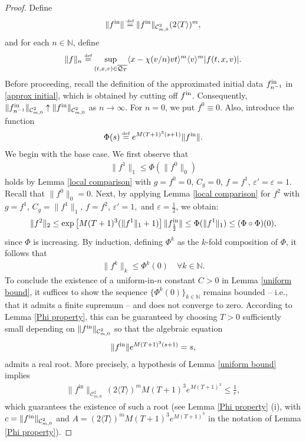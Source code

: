 \documentclass[reqno,11pt,final]{amsart}
\theoremstyle{plain}
\numberwithin{equation}{section}
\numberwithin{theorem}{section}
\newcommand{\eqdef }{\overset{\mbox{\tiny{def}}}{=}}
\begin{document}
\begin{proof}
Define
\begin{align*}
\|f^\textup{in}\| \eqdef \| f^\textup{in}\|_{\mathcal{C}^2_{m,0}}(2\langle T\rangle)^m,
\end{align*}and for each $n\in\mathbb{N}$, define
\begin{align*}
\| f\|_n \eqdef \sup_{(t,x,v)\in \overline{\mathcal{Q}_T}}\langle x-\chi(v/n)vt\rangle^m \langle v\rangle^m|f(t,x,v)|.
\end{align*}Before proceeding, recall the definition of the approximated initial data $f^\textup{in}_{n^{-1}}$ in \eqref{approx initial}, which is obtained by cutting off $f^\textup{in}$. Consequently, $\|f^\textup{in}_{n^{-1}}\|_{\mathcal{C}^2_{m,0}} \uparrow \|f^\textup{in}\|_{\mathcal{C}^2_{m,0}}$ as $n\to\infty$. For $n=0$, we put $f^0\equiv 0$. Also, introduce the function
\begin{align*}
\Phi(s) \eqdef e^{M(T+1)^3(s + 1)}\lVert f^\textup{in}\rVert.
\end{align*}We begin with the base case. We first observe that
\begin{align*}
\lVert f^1\rVert_1 \le \Phi(\lVert f^0\rVert_0)
\end{align*} holds by Lemma \ref{local comparison} with $g=f^0=0$, $C_g=0$, $f=f^1$, $\varepsilon'=\varepsilon=1$.  Recall that $\lVert f^0\rVert_0 =0$. Next, by applying Lemma \ref{local comparison} for $f^2$ with $g=f^1$, $C_g= \|f^1\|_1$, $f=f^2$, $\varepsilon'=1,$ and $\varepsilon=\frac{1}{2}$, we obtain:
\begin{align*}
\lVert f^2 \rVert_2
\le \exp\left[M(T+1)^3(\lVert f^1\rVert_1 + 1)\right]\lVert f^\textup{in}_{\frac{1}{2}}\rVert
 \le \Phi(\lVert f^1\rVert_1)
\le (\Phi\circ \Phi)(0),
\end{align*}since $\Phi$ is increasing. By induction, defining $\Phi^k$ as the $k$-fold composition of $\Phi$, it follows that
\begin{align*}
\lVert f^k \rVert_k \le \Phi^k (0) \quad \forall k\in\mathbb{N}.
\end{align*}To conclude the existence of a uniform-in-$n$ constant $C>0$ in Lemma \ref{uniform bound}, it suffices to show the sequence $\{\Phi^k(0)\}_{k\in\mathbb{N}}$ remains bounded -- i.e., that it admits a finite supremum -- and does not converge to zero. According to Lemma \ref{Phi property}, this can be guaranteed by choosing $T>0$ sufficiently small depending on $\lVert f^\textup{in}\rVert_{\mathcal{C}^2_{m,0}}$ so that the algebraic equation
\begin{align*}
\lVert f^\textup{in}\rVert e^{M(T+1)^3(s+1)} = s,
\end{align*}admits a real root. More precisely, a hypothesis of Lemma \ref{uniform bound} implies
\begin{align*}
    \|f^{\mathrm{in}}\|_{\mathcal{C}^2_{m,0}}
    \,(2\langle T\rangle)^m
    M (T+1)^3 e^{M(T+1)^3}
    \le \frac{1}{e},
\end{align*}
which guarantees the existence of such a root (see Lemma \ref{Phi property} (i), with $c= \|f^{\textup{in}}\|_{\mathcal{C}^2_{m,0}}$ and $A= (2\langle T\rangle)^m
    M (T+1)^3 e^{M(T+1)^3}$ in the notation of Lemma \ref{Phi property}).


\end{proof}
\end{document}
